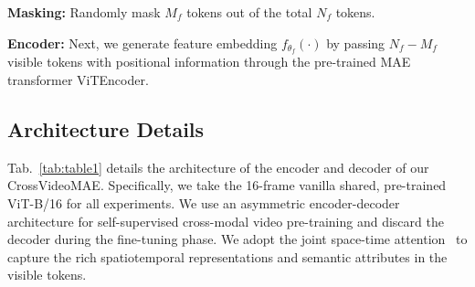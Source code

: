 \noindent\textbf{Masking:} Randomly mask \( M_f \) tokens out of the total \( N_f \) tokens.

\noindent\textbf{Encoder:} Next, we generate feature embedding \(f_{\theta_f}(\cdot)\) by passing \(N_f - M_f\) visible tokens with positional information through the pre-trained MAE~\cite{he2022masked} transformer ViTEncoder.

\subsection{Architecture Details}
\label{sec:detailed}

Tab.~\ref{tab:table1} details the architecture of the encoder and decoder of our CrossVideoMAE. Specifically, we take the 16-frame vanilla shared, pre-trained ViT-B/16 for all experiments. We use an asymmetric encoder-decoder architecture for self-supervised cross-modal video pre-training and discard the decoder during the fine-tuning phase. We adopt the joint space-time attention~\cite{arnab2021vivit,liu2022video} to capture the rich spatiotemporal representations and semantic attributes in the visible tokens. 

